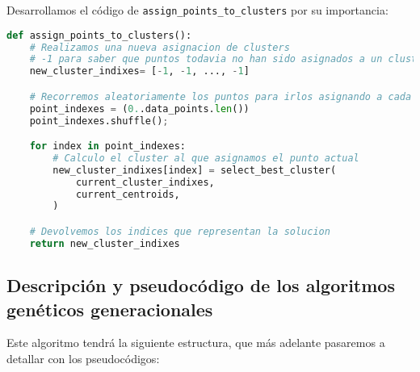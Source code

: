 \documentclass[11pt]{article}
\begin{document}
Desarrollamos el código de \lstinline{assign_points_to_clusters} por su importancia:

\begin{lstlisting}[language=Python, style=Boxed]
def assign_points_to_clusters():
    # Realizamos una nueva asignacion de clusters
    # -1 para saber que puntos todavia no han sido asignados a un cluster
    new_cluster_indixes= [-1, -1, ..., -1]

    # Recorremos aleatoriamente los puntos para irlos asignando a cada cluster
    point_indexes = (0..data_points.len())
    point_indexes.shuffle();

    for index in point_indexes:
        # Calculo el cluster al que asignamos el punto actual
        new_cluster_indixes[index] = select_best_cluster(
            current_cluster_indixes,
            current_centroids,
        )

    # Devolvemos los indices que representan la solucion
    return new_cluster_indixes
\end{lstlisting}

\pagebreak

\subsection{Descripción y pseudocódigo de los algoritmos genéticos generacionales}

Este algoritmo tendrá la siguiente estructura, que más adelante pasaremos a detallar con los pseudocódigos:
\end{document}
